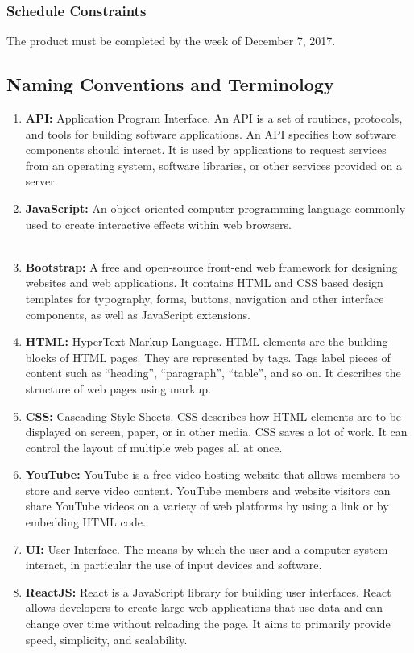 \documentclass[12pt, titlepage]{article}
\begin{document}
\subsubsection{Schedule Constraints}
The product must be completed by the week of December 7, 2017.

\subsection{Naming Conventions and Terminology}
\begin{enumerate}
  \item \textbf{API:} Application Program Interface. An API is a set of routines, protocols, and tools for building software applications. An API specifies how software components should interact. It is used by applications to request services from an operating system, software libraries, or other services provided on a server.
  \item \textbf{JavaScript:} An object-oriented computer programming language commonly used to create interactive effects within web browsers.
  \\\\
  \item \textbf{Bootstrap:} A free and open-source front-end web framework for designing websites and web applications. It contains HTML and CSS based design templates for typography, forms, buttons, navigation and other interface components, as well as JavaScript extensions.
  \item \textbf{HTML:} HyperText Markup Language. HTML elements are the building blocks of HTML pages. They are represented by tags. Tags label pieces of content such as “heading”, “paragraph”, “table”, and so on. It describes the structure of web pages using markup.
  \item \textbf{CSS:} Cascading Style Sheets. CSS describes how HTML elements are to be displayed on screen, paper, or in other media. CSS saves a lot of work. It can control the layout of multiple web pages all at once.
  \item \textbf{YouTube:} YouTube is a free video-hosting website that allows members to store and serve video content. YouTube members and website visitors can share YouTube videos on a variety of web platforms by using a link or by embedding HTML code.
  \item \textbf{UI:} User Interface. The means by which the user and a computer system interact, in particular the use of input devices and software.
  \item \textbf{ReactJS:} React is a JavaScript library for building user interfaces. React allows developers to create large web-applications that use data and can change over time without reloading the page. It aims to primarily provide speed, simplicity, and scalability.
\end{enumerate}
\end{document}
